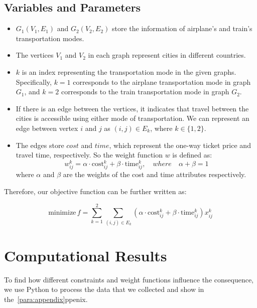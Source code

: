 \documentclass{article}
\begin{document}
\subsection*{Variables and Parameters}
\begin{itemize}
  \item $G_1(V_1, E_1)$ and $G_2(V_2, E_2)$ store the information of airplane's and train's transportation modes.
  \item The vertices $V_1$ and $V_2$ in each graph represent cities in different
        countries.
  \item $k$ is an index representing the transportation mode in the given graphs. Specifically, $k = 1$ corresponds to the airplane transportation mode in graph $G_1$, and $k = 2$ corresponds to the train transportation mode in graph $G_2$.
  \item If there is an edge between the vertices, it indicates that travel between the
        cities is accessible using either mode of transportation. We can represent an
        edge between vertex $i$ and $j$ as $(i, j) \in E_k$, where $k \in \{1, 2\}$.
  \item The edges store $cost$ and $time$, which represent the one-way ticket price and
        travel time, respectively. So the weight function $w$ is defined as:
        \begin{equation*}
          w_{ij}^k = \alpha \cdot \text{cost}_{ij}^k + \beta \cdot \text{time}_{ij}^k, \quad where \quad \alpha + \beta = 1
        \end{equation*}
        where $\alpha$ and $\beta$ are the weights of the cost and time attributes
        respectively.

\end{itemize}
Therefore, our objective function can be further written as:

\begin{equation*}
  \text{minimize}\, f = \sum_{k=1}^{2} \sum_{(i,j) \in E_k} (\alpha \cdot \text{cost}_{ij}^k + \beta \cdot \text{time}_{ij}^k) x_{ij}^k
\end{equation*}

\section{Computational Results}
To find how different constraints and weight functions influence the consequence, we use Python to process the data that we collected and show in the~\ref{para:appendix}ppenix. 
\end{document}
